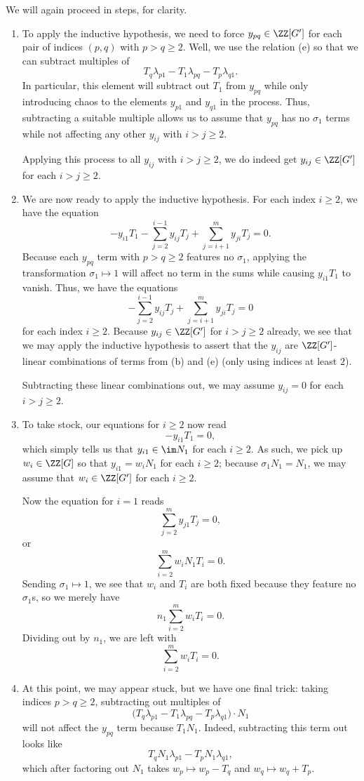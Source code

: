 We will again proceed in steps, for clarity.
\begin{enumerate}
	\item To apply the inductive hypothesis, we need to force $y_{pq}\in\ZZ[G']$ for each pair of indices $(p,q)$ with $p>q\ge2$. Well, we use the relation (e) so that we can subtract multiples of
	\[T_q\lambda_{p1}-T_1\lambda_{pq}-T_p\lambda_{q1}.\]
	In particular, this element will subtract out $T_1$ from $y_{pq}$ while only introducing chaos to the elements $y_{p1}$ and $y_{q1}$ in the process. Thus, subtracting a suitable multiple allows us to assume that $y_{pq}$ has no $\sigma_1$ terms while not affecting any other $y_{ij}$ with $i>j\ge2$.

	Applying this process to all $y_{ij}$ with $i>j\ge2$, we do indeed get $y_{ij}\in\ZZ[G']$ for each $i>j\ge2$.

	\item We are now ready to apply the inductive hypothesis. For each index $i\ge2$, we have the equation
	\[-y_{i1}T_1-\sum_{j=2}^{i-1}y_{ij}T_j+\sum_{j=i+1}^my_{ji}T_j=0.\]
	Because each $y_{pq}$ term with $p>q\ge2$ features no $\sigma_1$, applying the transformation $\sigma_1\mapsto1$ will affect no term in the sums while causing $y_{i1}T_1$ to vanish. Thus, we have the equations
	\[-\sum_{j=2}^{i-1}y_{ij}T_j+\sum_{j=i+1}^my_{ji}T_j=0\]
	for each index $i\ge2$. Because $y_{ij}\in\ZZ[G']$ for $i>j\ge2$ already, we see that we may apply the inductive hypothesis to assert that the $y_{ij}$ are $\ZZ[G']$-linear combinations of terms from (b) and (e) (only using indices at least $2$).
	
	Subtracting these linear combinations out, we may assume $y_{ij}=0$ for each $i>j\ge2$.

	\item To take stock, our equations for $i\ge2$ now read
	\[-y_{i1}T_1=0,\]
	which simply tells us that $y_{i1}\in\im N_1$ for each $i\ge2$. As such, we pick up $w_i\in\ZZ[G]$ so that $y_{i1}=w_iN_1$ for each $i\ge2$; because $\sigma_1N_1=N_1$, we may assume that $w_i\in\ZZ[G']$ for each $i\ge2$.

	Now the equation for $i=1$ reads
	\[\sum_{j=2}^my_{j1}T_j=0,\]
	or
	\[\sum_{i=2}^mw_iN_1T_i=0.\]
	Sending $\sigma_1\mapsto1$, we see that $w_i$ and $T_i$ are both fixed because they feature no $\sigma_1$s, so we merely have
	\[n_1\sum_{i=2}^mw_iT_i=0.\]
	Dividing out by $n_1$, we are left with
	\[\sum_{i=2}^mw_iT_i=0.\]

	\item At this point, we may appear stuck, but we have one final trick: taking indices $p>q\ge2$, subtracting out multiples of
	\[\big(T_q\lambda_{p1}-T_1\lambda_{pq}-T_p\lambda_{q1}\big)\cdot N_1\]
	will not affect the $y_{pq}$ term because $T_1N_1$. Indeed, subtracting this term out looks like
	\[T_qN_1\lambda_{p1}-T_pN_1\lambda_{q1},\]
	which after factoring out $N_1$ takes $w_p\mapsto w_p-T_q$ and $w_q\mapsto w_q+T_p$.


\end{enumerate}
